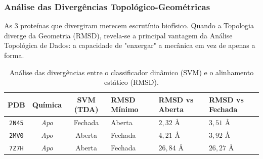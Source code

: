 \documentclass[12pt, a4paper]{article}
\begin{document}
\subsubsection{Análise das Divergências Topológico-Geométricas}

As 3 proteínas que divergiram merecem escrutínio biofísico. Quando a Topologia diverge da Geometria (RMSD), revela-se a principal vantagem da Análise Topológica de Dados: a capacidade de "enxergar" a mecânica em vez de apenas a forma.

\begin{table}[H]
    \centering
    \caption{Análise das divergências entre o classificador dinâmico (SVM) e o alinhamento estático (RMSD).}
    \label{tab:divergencias}
    \renewcommand{\arraystretch}{1.3}
    \setlength{\arraycolsep}{6pt} %
    
    \begin{tabular}{cc c >{\centering\arraybackslash}p{2.2cm} >{\centering\arraybackslash}p{2.2cm} >{\centering\arraybackslash}p{2.2cm}}
    \toprule
    \textbf{PDB} & \textbf{Química} & \textbf{SVM (TDA)} & \textbf{RMSD Mínimo} & \textbf{RMSD vs Aberta} & \textbf{RMSD vs Fechada} \\
    \midrule
    \texttt{2N45} & \textit{Apo} & Fechada & Aberta  & $2,32$ \AA & $3,51$ \AA \\
    \texttt{2MV0} & \textit{Apo} & Aberta  & Fechada & $4,21$ \AA & $3,92$ \AA \\
    \texttt{7Z7H} & \textit{Apo} & Aberta  & Fechada & $26,84$ \AA & $26,27$ \AA \\
    \bottomrule
    \end{tabular}
\end{table}
\end{document}
